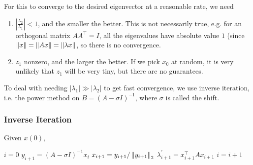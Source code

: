 \documentclass[11pt]{article}
\numberwithin{equation}{section}
\begin{document}
For this to converge to the desired eigenvector at a reasonable rate, we need \begin{enumerate}
    \item $|\frac{\lambda_2}{\lambda_1}|<1$, and the smaller the better. This is not necessarily true, e.g. for an orthogonal matrix $AA^\top = I$, 
    all the eigenvalues have absolute value $1$ (since $\left\| x \right\| = \left\| Ax \right\| = \left\| \lambda x \right\|$, so there is no convergence.
    \item $z_1$ nonzero, and the larger the better. If we pick $x_0$ at random, it is very unlikely that $z_1$ will be very tiny, but there are no guarantees.
\end{enumerate}

To deal with needing $|\lambda_1| \gg |\lambda_2|$ to get fast convergence, we use inverse iteration, i.e. the power method on $B = (A - \sigma I)^{-1}$, 
where $\sigma$ is called the shift.

\subsubsection{Inverse Iteration}
Given $x(0)$,
\begin{algorithmfrm}
    \begin{algorithmic}[1]
        \State $i = 0$
        \State $y_{i+1} = (A - \sigma I)^{-1} x_i$
        \State $x_{i+1} = y_{i+1} / \left\| y_{i+1} \right\|_2$
        \State $\lambda^{\prime}_{i+1} = x_{i+1}^\top A x_{i+1}$
        \State $i = i + 1$
        \EndWhile
    \end{algorithmic}
\end{algorithmfrm}
\end{document}
